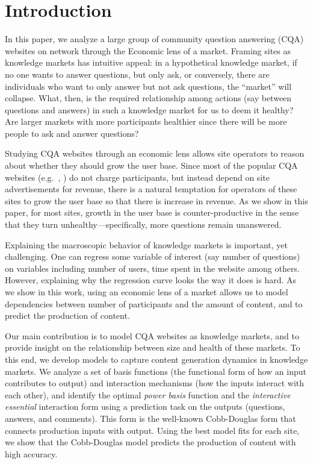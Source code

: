 \section{Introduction}

In this paper, we analyze a large group of community question answering (CQA) websites on  network through the Economic lens of a market. Framing  sites as knowledge markets has intuitive appeal: in a hypothetical knowledge market, if no one wants to answer questions, but only ask, or conversely, there are individuals who want to only answer but not ask questions, the ``market'' will collapse. What, then, is the required relationship among actions (say between questions and answers) in such a knowledge market for us to deem it healthy? Are larger markets with more participants healthier since there will be more people to ask and answer questions? 

Studying CQA websites through an economic lens allows site operators to reason about whether they should grow the user base. Since most of the popular CQA websites (e.g.\ , ) do not charge participants, but instead depend on site advertisements for revenue, there is a natural temptation for operators of these sites to grow the user base so that there is increase in revenue. As we show in this paper, for most  sites, growth in the user base is counter-productive in the sense that they turn unhealthy---specifically, more questions remain unanswered.

Explaining the macroscopic behavior of knowledge markets is important, yet challenging. One can regress some variable of interest (say number of questions) on variables including number of users, time spent in the website among others. However, explaining why the regression curve looks the way it does is hard. As we show in this work, using an economic lens of a market allows us to model dependencies between number of participants and the amount of content, and to predict the production of content.

Our main contribution is to model CQA websites as knowledge markets, and to provide insight on the relationship between size and health of these markets. To this end, we develop models to capture content generation dynamics in knowledge markets. We analyze a set of basis functions (the functional form of how an input contributes to output) and interaction mechanisms (how the inputs interact with each other), and identify the optimal \emph{power basis} function and the \emph{interactive essential} interaction form using a prediction task on the outputs (questions, answers, and comments). This form is the well-known Cobb-Douglas form that connects production inputs with output. Using the best model fits for each  site, we show that the Cobb-Douglas model predicts the production of content with high accuracy.

